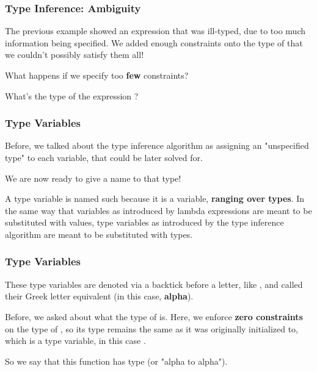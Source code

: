 \documentclass[aspectratio=169]{beamer}
\begin{document}
\begin{frame}[fragile]
  \frametitle{Type Inference: Ambiguity}

  The previous example showed an expression that was ill-typed, 
  due to too much information being specified. We added enough 
  constraints onto the type of  that we couldn't possibly
  satisfy them all!

  What happens if we specify too \textbf{few} constraints?

  What's the type of the expression ?
\end{frame}


\begin{frame}[fragile]
  \frametitle{Type Variables}

  Before, we talked about the type inference algorithm as assigning an
  "unspecified type" to each variable, that could be later solved for.

  We are now ready to give a name to that type!


  A type variable is named such because it is a variable, \textbf{ranging
  over types}. In the same way that variables as introduced by lambda expressions
  are meant to be substituted with values, type variables as introduced by
  the type inference algorithm are meant to be substituted with types.
\end{frame}

\begin{frame}[fragile]
  \frametitle{Type Variables}

  These type variables are denoted via a backtick before a letter, like
  , and called their Greek letter equivalent (in this case, \textbf{alpha}).

  Before, we asked about what the type of  is. Here, we enforce 
  \textbf{zero constraints} on the type of , so its type remains the same
  as it was originally initialized to, which is a type variable, in this case .
  
  So we say that this function has type  (or "alpha to alpha").
\end{frame}
\end{document}
